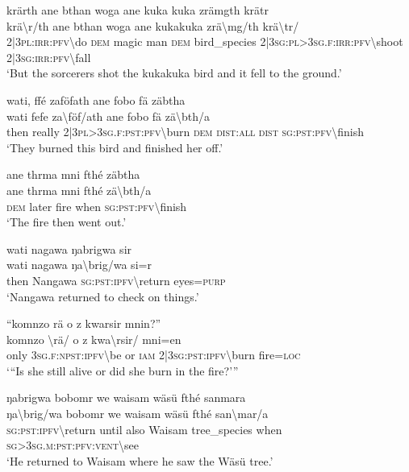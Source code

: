 \ea\label{ex:7:a4852}
krärth ane bthan woga ane kuka kuka zrämgth krätr\\
\gll krä{\textbackslash}r/th	ane	bthan	woga	ane	kukakuka	zrä{\textbackslash}mg/th	krä{\textbackslash}tr/\\
     2|3\textsc{pl}:\textsc{irr}:\textsc{pfv}{\textbackslash}do	\textsc{dem}	magic	man	\textsc{dem}	bird\_species	2|3\textsc{sg}:\textsc{pl}>3\textsc{sg}.\textsc{f}:\textsc{irr}:\textsc{pfv}{\textbackslash}shoot	2|3\textsc{sg}:\textsc{irr}:\textsc{pfv}{\textbackslash}fall\\
\glt `But the sorcerers shot the kukakuka bird and it fell to the ground.'
\z

\ea\label{ex:7:a4854}
wati, ffé zaföfath ane fobo fä zäbtha\\
\gll wati	fefe	za{\textbackslash}föf/ath	ane	fobo	fä	zä{\textbackslash}bth/a\\
     then	really	2|3\textsc{pl}>3\textsc{sg}.\textsc{f}:\textsc{pst}:\textsc{pfv}{\textbackslash}burn	\textsc{dem}	\textsc{dist}:\textsc{all}	\textsc{dist}	\textsc{sg}:\textsc{pst}:\textsc{pfv}{\textbackslash}finish\\
\glt `They burned this bird and finished her off.'
\z

\ea\label{ex:7:a4856}
ane thrma mni fthé zäbtha\\
\gll ane	thrma	mni	fthé	zä{\textbackslash}bth/a\\
     \textsc{dem}	later	fire	when	\textsc{sg}:\textsc{pst}:\textsc{pfv}{\textbackslash}finish\\
\glt `The fire then went out.'
\z

\ea\label{ex:7:a4858}
wati nagawa ŋabrigwa sir\\
\gll wati	nagawa	ŋa{\textbackslash}brig/wa	si=r\\
     then	Nangawa	\textsc{sg}:\textsc{pst}:\textsc{ipfv}{\textbackslash}return	eyes=\textsc{purp}\\
\glt `Nangawa returned to check on things.'
\z

\ea\label{ex:7:a4860}
``komnzo rä o z kwarsir mnin?''\\
\gll komnzo	{\textbackslash}rä/	o	z	kwa{\textbackslash}rsir/	mni=en\\
     only	3\textsc{sg}.\textsc{f}:\textsc{npst}:\textsc{ipfv}{\textbackslash}be	or	\textsc{iam}	2|3\textsc{sg}:\textsc{pst}:\textsc{ipfv}{\textbackslash}burn	fire=\textsc{loc}\\
\glt `{``}Is she still alive or did she burn in the fire?'''
\z

\ea\label{ex:7:a4861}
ŋabrigwa bobomr we waisam wäsü fthé sanmara\\
\gll ŋa{\textbackslash}brig/wa	bobomr	we	waisam	wäsü	fthé	san{\textbackslash}mar/a\\
     \textsc{sg}:\textsc{pst}:\textsc{ipfv}{\textbackslash}return	until	also	Waisam	tree\_species	when	\textsc{sg}>3\textsc{sg}.\textsc{m}:\textsc{pst}:\textsc{pfv}:\textsc{vent}{\textbackslash}see\\
\glt `He returned to Waisam where he saw the Wäsü tree.'
\z

